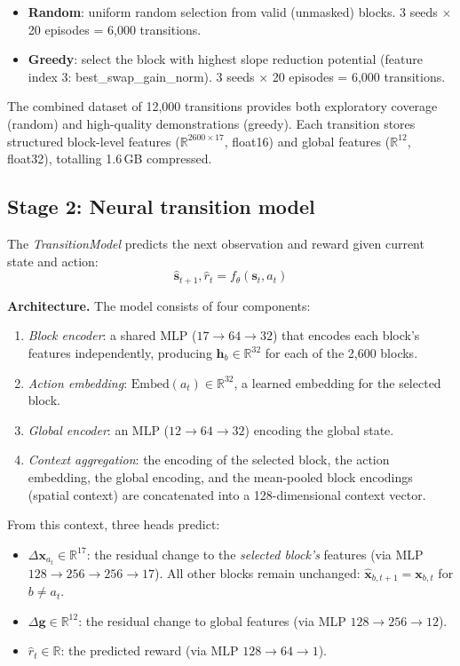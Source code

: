 \documentclass[11pt]{article}
\begin{document}
\begin{itemize}
\item \textbf{Random}: uniform random selection from valid (unmasked) blocks. 3 seeds $\times$ 20 episodes = 6{,}000 transitions.
\item \textbf{Greedy}: select the block with highest slope reduction potential (feature index 3: best\_swap\_gain\_norm). 3 seeds $\times$ 20 episodes = 6{,}000 transitions.
\end{itemize}

The combined dataset of 12{,}000 transitions provides both exploratory coverage (random) and high-quality demonstrations (greedy). Each transition stores structured block-level features ($\mathbb{R}^{2600 \times 17}$, float16) and global features ($\mathbb{R}^{12}$, float32), totalling 1.6\,GB compressed.

\subsection{Stage 2: Neural transition model}

The \textit{TransitionModel} predicts the next observation and reward given current state and action:
\begin{equation}
\hat{\mathbf{s}}_{t+1}, \hat{r}_t = f_\theta(\mathbf{s}_t, a_t)
\end{equation}

\textbf{Architecture.} The model consists of four components:
\begin{enumerate}
\item \textit{Block encoder}: a shared MLP ($17 \to 64 \to 32$) that encodes each block's features independently, producing $\mathbf{h}_b \in \mathbb{R}^{32}$ for each of the 2{,}600 blocks.
\item \textit{Action embedding}: $\text{Embed}(a_t) \in \mathbb{R}^{32}$, a learned embedding for the selected block.
\item \textit{Global encoder}: an MLP ($12 \to 64 \to 32$) encoding the global state.
\item \textit{Context aggregation}: the encoding of the selected block, the action embedding, the global encoding, and the mean-pooled block encodings (spatial context) are concatenated into a 128-dimensional context vector.
\end{enumerate}

From this context, three heads predict:
\begin{itemize}
\item $\Delta\mathbf{x}_{a_t} \in \mathbb{R}^{17}$: the residual change to the \textit{selected block's} features (via MLP $128 \to 256 \to 256 \to 17$). All other blocks remain unchanged: $\hat{\mathbf{x}}_{b,t+1} = \mathbf{x}_{b,t}$ for $b \neq a_t$.
\item $\Delta\mathbf{g} \in \mathbb{R}^{12}$: the residual change to global features (via MLP $128 \to 256 \to 12$).
\item $\hat{r}_t \in \mathbb{R}$: the predicted reward (via MLP $128 \to 64 \to 1$).
\end{itemize}
\end{document}
